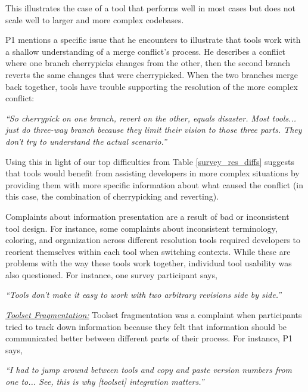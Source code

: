  This illustrates the case of a tool that performs well in most cases but does not scale well to larger and more complex codebases.
 
 P1 mentions a specific issue that he encounters to illustrate that tools work with a shallow understanding of a merge conflict's process. He describes a conflict where one branch cherrypicks changes from the other, then the second branch reverts the same changes that were cherrypicked. When the two branches merge back together, tools have trouble supporting the resolution of the more complex conflict:
 \begin{displayquote}
 \textit{``So cherrypick on one branch, revert on the other, equals disaster. Most tools... just do three-way branch because they limit their vision to those three parts. They don't try to understand the actual scenario.''}
 \end{displayquote}
 Using this in light of our top difficulties from Table \ref{survey_res_diffs} suggests that tools would benefit from assisting developers in more complex situations by providing them with more specific information about what caused the conflict (in this case, the combination of cherrypicking and reverting).

Complaints about information presentation are a result of bad or inconsistent tool design. For instance, some complaints about inconsistent terminology, coloring, and organization across different resolution tools required developers to reorient themselves within each tool when switching contexts. While these are problems with the way these tools work together, individual tool usability was also questioned. For instance, one survey participant says, 
\begin{displayquote}
\textit{``Tools don't make it easy to work with two arbitrary revisions side by side.''}
\end{displayquote}

\underline{\textit{Toolset Fragmentation:}} Toolset fragmentation was a complaint when participants tried to track down information because they felt that information should be communicated better between different parts of their process. For instance, P1 says, 

\begin{displayquote}
\textit{``I had to jump around between tools and copy and paste version numbers from one to... See, this is why [toolset] integration matters.''}
\end{displayquote}

